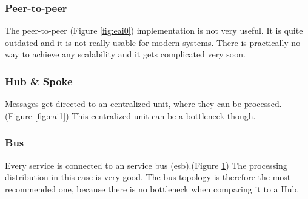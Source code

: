 \documentclass[12pt]{article}
\begin{document}
\subsubsection{Peer-to-peer}
The peer-to-peer (Figure \ref{fig:eai0}) implementation is not very useful. It is quite outdated and it is not really usable for modern systems.
There is practically no way to achieve any scalability and it gets complicated very soon. 
\subsubsection{Hub \& Spoke}
Messages get directed to an centralized unit, where they can be processed. (Figure \ref{fig:eai1}) This centralized unit can be a bottleneck though. 
\subsubsection{Bus}
Every service is connected to an service bus (\gls{esb}).(Figure \ref{fig:eai2}) The processing distribution in this case is very good. The bus-topology is therefore the most recommended one, because there is no bottleneck when comparing it to a Hub.
\begin{figure}[here!]
\centering
\begin{minipage}[h]{0.3\textwidth}
\centering
    \label{fig:eai0}
\end{minipage}
\begin{minipage}[h]{0.3\textwidth}
\centering
    \label{fig:eai1}
\end{minipage}
\begin{minipage}[h]{0.3\textwidth}
\centering
    \label{fig:eai2}
\end{minipage}
\end{figure}
\FloatBarrier

\listoftables
\listoffigures
\printglossaries
\end{document}
